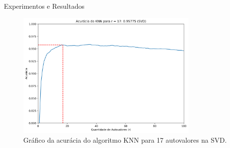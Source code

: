 \documentclass{beamer}
\theoremstyle{definition}
\begin{document}
\begin{frame}{Experimentos e Resultados}
\begin{figure}[H]
  \centering
  \caption{Gráfico da acurácia do algoritmo KNN para 17 autovalores na SVD.}
  \includegraphics[width=9cm]{acuracia_svd_17}
\end{figure}
\end{frame}
\end{document}
